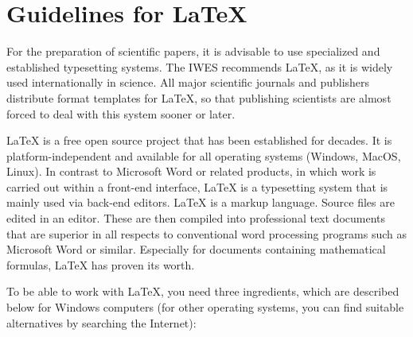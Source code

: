 \chapter{Guidelines for \LaTeX{}}
\label{cha:latex_EN}






For the preparation of scientific papers, it is advisable to use specialized and established typesetting systems. The IWES recommends \LaTeX{}, as it is widely used internationally in science. All major scientific journals and publishers distribute format templates for \LaTeX{}, so that publishing scientists are almost forced to deal with this system sooner or later.

\LaTeX{} is a free open source project that has been established for decades. It is platform-independent and available for all operating systems (Windows, MacOS, Linux). In contrast to Microsoft Word or related products, in which work is carried out within a front-end interface, \LaTeX{} is a typesetting system that is mainly used via back-end editors. \LaTeX{} is a markup language. Source files are edited in an editor. These are then compiled into professional text documents that are superior in all respects to conventional word processing programs such as Microsoft Word or similar. Especially for documents containing mathematical formulas, \LaTeX{} has proven its worth.

To be able to work with \LaTeX{}, you need three ingredients, which are described below for Windows computers (for other operating systems, you can find suitable alternatives by searching the Internet):


